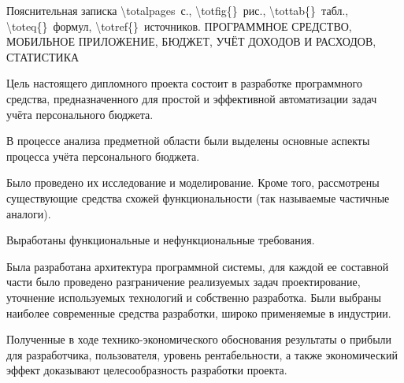 \thispagestyle{empty}


\begin{center}
	Пояснительная записка \num{\totalpages}~с., 
	\num{\totfig{}}~рис., 
	\num{\tottab{}}~табл., 
	\num{\toteq{}}~формул, 
	\num{\totref{}}~источников.
	\MakeUppercase{Программное средство, мобильное приложение, бюджет, учёт доходов и расходов, статистика}
\end{center}

Цель настоящего дипломного проекта состоит в разработке программного средства, предназначенного для простой и эффективной автоматизации задач учёта персонального бюджета.


В процессе анализа предметной области были выделены основные аспекты процесса учёта персонального бюджета.

Было проведено их исследование и моделирование.
Кроме того, рассмотрены существующие средства схожей функциональности (так называемые частичные аналоги).

Выработаны функциональные и нефункциональные требования.

Была разработана архитектура программной системы, для каждой ее составной части было проведено разграничение реализуемых задач проектирование, уточнение используемых технологий и собственно разработка.
Были выбраны наиболее современные средства разработки, широко применяемые в индустрии.

Полученные в ходе технико-экономического обоснования результаты о прибыли для разработчика, пользователя, уровень рентабельности, а также экономический эффект доказывают целесообразность разработки про\-екта.
